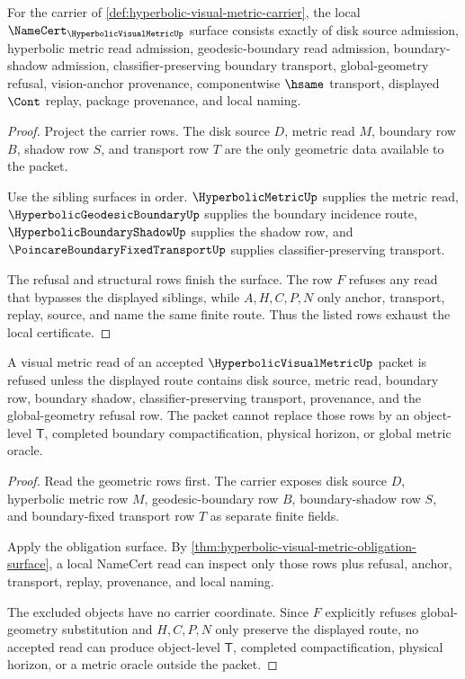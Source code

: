 \begin{theorem}
\label{thm:hyperbolic-visual-metric-obligation-surface}
For the carrier of \autoref{def:hyperbolic-visual-metric-carrier}, the local $\NameCert_{\HyperbolicVisualMetricUp}$ surface consists exactly of disk source admission, hyperbolic metric read admission, geodesic-boundary read admission, boundary-shadow admission, classifier-preserving boundary transport, global-geometry refusal, vision-anchor provenance, componentwise $\hsame$ transport, displayed $\Cont$ replay, package provenance, and local naming.
\end{theorem}
\begin{proof}
Project the carrier rows. The disk source $D$, metric read $M$, boundary row $B$, shadow row $S$, and transport row $T$ are the only geometric data available to the packet.

Use the sibling surfaces in order. $\HyperbolicMetricUp$ supplies the metric read, $\HyperbolicGeodesicBoundaryUp$ supplies the boundary incidence route, $\HyperbolicBoundaryShadowUp$ supplies the shadow row, and $\PoincareBoundaryFixedTransportUp$ supplies classifier-preserving transport.

The refusal and structural rows finish the surface. The row $F$ refuses any read that bypasses the displayed siblings, while $A,H,C,P,N$ only anchor, transport, replay, source, and name the same finite route. Thus the listed rows exhaust the local certificate.
\end{proof}

\begin{theorem}
\label{thm:hyperbolic-visual-metric-global-geometry-refusal}
A visual metric read of an accepted $\HyperbolicVisualMetricUp$ packet is refused unless the displayed route contains disk source, metric read, boundary row, boundary shadow, classifier-preserving transport, provenance, and the global-geometry refusal row. The packet cannot replace those rows by an object-level $\mathsf{T}$, completed boundary compactification, physical horizon, or global metric oracle.
\end{theorem}
\begin{proof}
Read the geometric rows first. The carrier exposes disk source $D$, hyperbolic metric row $M$, geodesic-boundary row $B$, boundary-shadow row $S$, and boundary-fixed transport row $T$ as separate finite fields.

Apply the obligation surface. By \autoref{thm:hyperbolic-visual-metric-obligation-surface}, a local NameCert read can inspect only those rows plus refusal, anchor, transport, replay, provenance, and local naming.

The excluded objects have no carrier coordinate. Since $F$ explicitly refuses global-geometry substitution and $H,C,P,N$ only preserve the displayed route, no accepted read can produce object-level $\mathsf{T}$, completed compactification, physical horizon, or a metric oracle outside the packet.
\end{proof}


